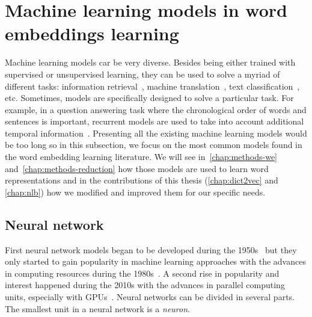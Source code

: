 \section{Machine learning models in word embeddings learning}
  \label{ch02:sec:ml-for-we}
  Machine learning models car be very diverse. Besides being either trained with
  supervised or unsupervised learning, they can be used to solve a myriad of
  different tasks: information retrieval~\citep{manning2008introduction},
  machine translation~\citep{hunsicker2012machine}, text
  classification~\citep{zhang2015character}, etc. Sometimes, models are
  specifically designed to solve a particular task. For example, in a question
  answering task where the chronological order of words and sentences is
  important, recurrent models are used to take into account additional temporal
  information~\citep{yin2015neural}.  Presenting all the existing machine
  learning models would be too long so in this subsection, we focus on the most
  common models found in the word embedding learning literature. We will see
  in~\autoref{chap:methods-we} and~\autoref{chap:methods-reduction} how those
  models are used to learn word representations and in the contributions of this
  thesis (\autoref{chap:dict2vec} and \autoref{chap:nlb}) how we modified and
  improved them for our specific needs.

  \subsection{Neural network}
    \label{ch02:subsec:neural-network}
    First neural network models began to be developed during the
    1950s~\citep{rosenblatt1958perceptron} but they only started to gain
    popularity in machine learning approaches with the advances in computing
    resources during the 1980s~\citep{reilly1982neural,rumelhart1986learning}. A
    second rise in popularity and interest happened during the 2010s with the
    advances in parallel computing units, especially with
    GPUs~\citep{krizhevsky2012imagenet, parkhi2015deep, silver2016mastering}.
    Neural networks can be divided in several parts. The smallest unit in a
    neural network is a \textit{neuron}.

